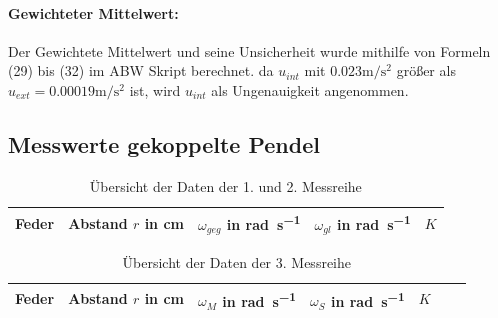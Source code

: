 \documentclass[11pt, a4paper]{article}
\begin{document}
    \paragraph{Gewichteter Mittelwert:}
    Der Gewichtete Mittelwert und seine Unsicherheit wurde mithilfe von
    Formeln (29) bis (32) im ABW Skript\cite{ABW} berechnet. da $u_{int}$ mit $0.023\si{\metre\per\square\second}$
    größer als $u_{ext} = 0.00019\si{\metre\per\square\second}$ ist, wird $u_{int}$ als Ungenauigkeit angenommen.

    \subsection{Messwerte gekoppelte Pendel} \label{kmess}

    \begin{table}[H]
        \label{mess1}
        \centering
        \begin{tabular}{c c c c c}
            Feder & Abstand $r$ in \si{\centi\metre} & $\omega_{geg}$ in \si{\radian\per\second} &
            $\omega_{gl}$ in \si{\radian\per\second} & $K$ \\ \hline
            
            
        \end{tabular}
        \caption{Übersicht der Daten der 1. und 2. Messreihe}
    \end{table}

    \begin{table}[H]
        \label{mess2}
        \centering
        \begin{tabular}{c c c c c c c}
            Feder & Abstand $r$ in \si{\centi\metre} & $\omega_{M}$ in \si{\radian\per\second} & $\omega_{S}$ in \si{\radian\per\second} & $K$ \\ \hline
            
            
        \end{tabular}
        \caption{Übersicht der Daten der 3. Messreihe}
    \end{table}


    
    
\end{document}

